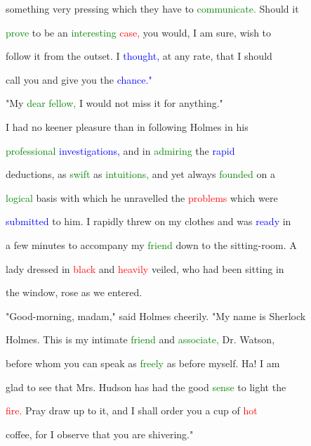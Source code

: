  something very pressing which they have to \textcolor{green}{communicate.} Should it

 \textcolor{green}{prove} to be an \textcolor{green}{interesting} \textcolor{red}{case,} you would, I am sure, wish to

 follow it from the outset. I \textcolor{blue}{thought,} at any rate, that I should

 call you and give you the \textcolor{blue}{chance."}



 "My \textcolor{green}{dear} \textcolor{green}{fellow,} I would not miss it for anything."



 I had no keener pleasure than in following Holmes in his

 \textcolor{green}{professional} \textcolor{blue}{investigations,} and in \textcolor{green}{admiring} the \textcolor{blue}{rapid}

 deductions, as \textcolor{green}{swift} as \textcolor{green}{intuitions,} and yet always \textcolor{green}{founded} on a

 \textcolor{green}{logical} basis with which he unravelled the \textcolor{red}{problems} which were

 \textcolor{blue}{submitted} to him. I rapidly threw on my clothes and was \textcolor{blue}{ready} in

 a few minutes to accompany my \textcolor{green}{friend} down to the sitting-room. A

 lady dressed in \textcolor{red}{black} and \textcolor{red}{heavily} veiled, who had been sitting in

 the window, rose as we entered.



 "Good-morning, madam," said Holmes cheerily. "My name is Sherlock

 Holmes. This is my \textcolor{BurntOrange}{intimate} \textcolor{green}{friend} and \textcolor{green}{associate,} Dr. Watson,

 before whom you can speak as \textcolor{green}{freely} as before myself. Ha! I am

 \textcolor{BurntOrange}{glad} to see that Mrs. Hudson has had the \textcolor{BurntOrange}{good} \textcolor{green}{sense} to light the

 \textcolor{red}{fire.} \textcolor{BurntOrange}{Pray} draw up to it, and I shall order you a cup of \textcolor{red}{hot}

 coffee, for I observe that you are \textcolor{BurntOrange}{shivering."}



